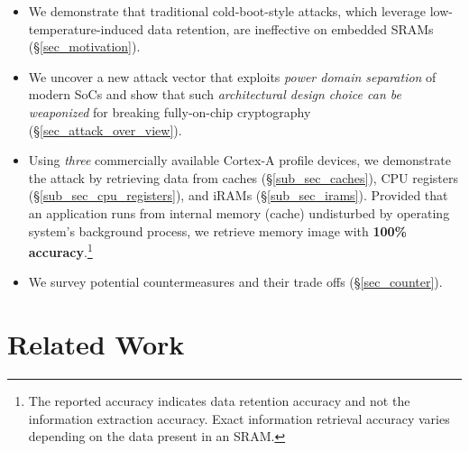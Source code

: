 \begin{itemize}
    \item We demonstrate that traditional cold-boot-style attacks, which leverage low-temperature-induced data retention, are ineffective on embedded SRAMs (\S\ref{sec_motivation}).
    \item We uncover a new attack vector that exploits \textit{power domain separation} of modern SoCs and show that such \textit{architectural design choice can be weaponized} for breaking fully-on-chip cryptography (\S\ref{sec_attack_over_view}). 
    \item Using \textit{three} commercially available Cortex-A profile devices, we demonstrate the attack by retrieving data from caches (\S\ref{sub_sec_caches}), CPU registers (\S\ref{sub_sec_cpu_registers}), and iRAMs (\S\ref{sub_sec_irams}). Provided that an application runs from internal memory (\eg cache) undisturbed by operating system's background process,  we retrieve memory image with \textbf{100\% accuracy}.\footnote{The reported accuracy indicates data retention accuracy and not the information extraction accuracy. Exact information retrieval accuracy varies depending on the data present in an SRAM.}
    \item We survey potential countermeasures and their trade offs (\S\ref{sec_counter}).
\end{itemize}








\usepackage[english]{babel} \usepackage{listings}   \usepackage{keyval}	
\usepackage{xurl}\usepackage{hyperref}   \usepackage{xspace}		\usepackage{graphicx}   \usepackage{url}
\usepackage{subcaption}\usepackage{amsfonts}   \usepackage{pifont}     \let\Bbbk\relax
\newcommand{\cmark}{\ding{51}}
\newcommand{\xmark}{\ding{55}}
\usepackage{enumitem}	\usepackage{multirow}   \usepackage{multicol}
\usepackage{tikz}


\usepackage{amsmath}    \usepackage{caption}                       \usepackage[linesnumbered,ruled]{algorithm2e}
\usepackage{newtxmath}
\usepackage{fancyhdr}
\usepackage{float}
\usepackage{algorithmic}    

\usepackage{makecell}   \usepackage{bm}         

\usepackage[T1]{fontenc}\usepackage{textcomp}   

\usepackage{amssymb}\usepackage{pifont}\section{Related Work}
\label{sec_related_works}

